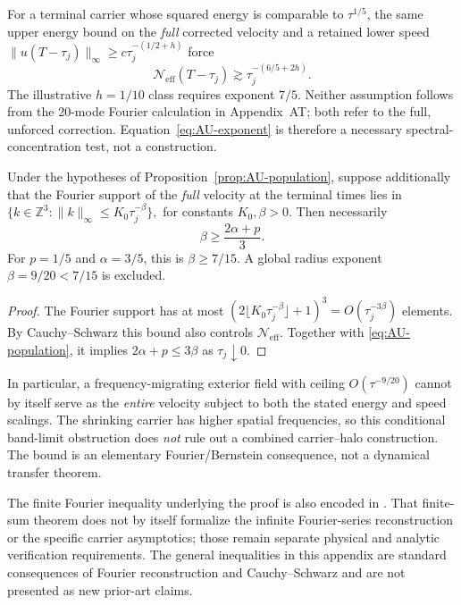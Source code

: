 For a terminal carrier whose squared energy is comparable to
\(\tau^{1/5}\), the same upper energy bound on the \emph{full}
corrected velocity and a retained lower speed
\(\|u(T-\tau_j)\|_\infty\ge c\tau_j^{-(1/2+h)}\)
force
\begin{equation}\label{eq:AU-exponent}
 \mathcal N_{\mathrm{eff}}(T-\tau_j)
 \gtrsim\tau_j^{-(6/5+2h)}.
\end{equation}
The illustrative \(h=1/10\) class requires exponent \(7/5\).
Neither assumption follows from the 20-mode Fourier calculation
in Appendix~AT; both refer to the full, unforced correction.
Equation~\eqref{eq:AU-exponent} is therefore a necessary
spectral-concentration test, not a construction.

\begin{auproposition}
\label{prop:AU-band}
Under the hypotheses of Proposition~\ref{prop:AU-population},
suppose additionally that the Fourier support of the \emph{full}
velocity at the terminal times lies in
\(
 \{k\in\mathbb Z^3:\|k\|_\infty\le K_0\tau_j^{-\beta}\},
\)
for constants \(K_0,\beta>0\). Then necessarily
\[
 \beta\ge\frac{2\alpha+p}{3}.
\]
For \(p=1/5\) and \(\alpha=3/5\), this is
\(\beta\ge7/15\). A global radius exponent
\(\beta=9/20<7/15\) is excluded.
\end{auproposition}

\begin{proof}
The Fourier support has at most
\((2\lfloor K_0\tau_j^{-\beta}\rfloor+1)^3
=O(\tau_j^{-3\beta})\) elements.
By Cauchy--Schwarz this bound also controls
\(\mathcal N_{\mathrm{eff}}\).
Together with \eqref{eq:AU-population}, it implies
\(2\alpha+p\le 3\beta\) as \(\tau_j\downarrow0\).
\end{proof}

In particular, a frequency-migrating exterior field with ceiling
\(O(\tau^{-9/20})\) cannot by itself serve as the \emph{entire}
velocity subject to both the stated energy and speed scalings.
The shrinking carrier has higher spatial frequencies, so this
conditional band-limit obstruction does \emph{not} rule out a
combined carrier--halo construction. The bound is an elementary
Fourier/Bernstein consequence, not a dynamical transfer theorem.

The finite Fourier inequality underlying the proof is also encoded
in .
That finite-sum theorem does not by itself formalize the infinite
Fourier-series reconstruction or the specific carrier asymptotics;
those remain separate physical and analytic verification
requirements. The general inequalities in this appendix are
standard consequences of Fourier reconstruction and
Cauchy--Schwarz and are not presented as new prior-art claims.
